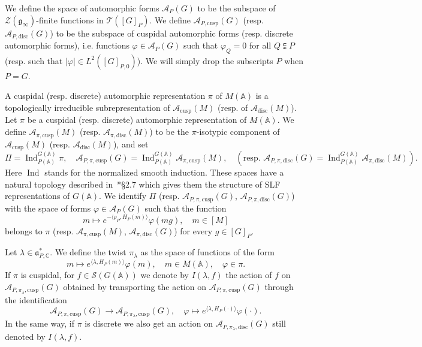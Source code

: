 \documentclass[letterpaper,11pt]{amsart}
\newcommand{\fa}{\mathfrak{a}}
\newcommand{\fg}{\mathfrak{g}}
\newcommand{\bA}{\mathbb{A}}
\newcommand{\C}{\mathbb{C}}
\newcommand{\cA}{\mathcal{A}}
\newcommand{\cS}{\mathcal{S}}
\newcommand{\cT}{\mathcal{T}}
\newcommand{\cZ}{\mathcal{Z}}
\newcommand{\<}{\negthickspace}
\newcommand{\valP}[1]{\left|#1\right|}
\DeclareMathOperator{\Ind}{Ind}
\theoremstyle{definition}
\theoremstyle{plain}
\theoremstyle{remark}
\numberwithin{equation}{section}
\begin{document}
We define the space of
automorphic forms $\cA_P(G)$ to be the subspace of $\cZ(\fg_\infty)$-finite
functions in $\cT([G]_P)$. We define $\cA_{P, \mathrm{cusp}}(G)$ (resp. $\cA_{P, \mathrm{disc}}(G)$) to be the subspace
of cuspidal automorphic forms (resp. discrete automorphic forms), i.e. functions $\varphi \in \cA_{P}(G)$ such that
$\varphi_Q = 0$ for all $Q \subsetneqq P$ (resp. such that $\valP{\varphi} \in L^2([G]_{P,0})$). We will simply drop the subscripts $P$ when $P
= G$.

A cuspidal (resp. discrete) automorphic representation $\pi$ of $M(\bA)$ is a topologically
irreducible subrepresentation of $\cA_{\mathrm{cusp}}(M)$ (resp. of $\cA_{\mathrm{disc}}(M)$). Let $\pi$ be a
cuspidal (resp. discrete) automorphic representation of $M(\bA)$. We define $\cA_{\pi,
\mathrm{cusp}}(M)$ (resp. $\cA_{\pi,
\mathrm{disc}}(M)$) to be the $\pi$-isotypic component of
$\cA_{\mathrm{cusp}}(M)$ (resp. $\cA_{\mathrm{disc}}(M)$), and set
    \[
    \Pi = \Ind_{P(\bA)}^{G(\bA)} \pi, \quad
    \cA_{P, \pi, \mathrm{cusp}}(G) = \Ind_{P(\bA)}^{G(\bA)}
    \cA_{\pi, \mathrm{cusp}}(M), \quad \left( \text{resp. } \cA_{P, \pi, \mathrm{disc}}(G) = \Ind_{P(\bA)}^{G(\bA)}
    \cA_{\pi, \mathrm{disc}}(M) \right).
    \]
Here $\Ind$ stands for the normalized smooth induction. These spaces have a natural topology described in~\cite{BPCZ}*{\S 2.7} which gives them the structure of SLF representations of $G(\bA)$. We identify
$\Pi$ (resp. $\cA_{P, \pi, \mathrm{cusp}}(G)$, $\cA_{P, \pi, \mathrm{disc}}(G)$) with the space of
forms $\varphi \in \cA_{P}(G)$ such that the function
    \[
    m \mapsto e^{-\langle \rho_P, H_P(m) \rangle} \varphi(mg), \quad
    m \in [M]
    \]
belongs to $\pi$ (resp. $\cA_{\pi, \mathrm{cusp}}(M)$, $\cA_{\pi, \mathrm{disc}}(G)$) for every $g \in [G]_P$.

Let $\lambda \in \fa_{P, \C}^*$. We define the twist $\pi_{\lambda}$ as the
space of functions of the form
    \[
    m \mapsto e^{\langle \lambda, H_P(m) \rangle} \varphi(m), \quad
    m \in M(\bA), \quad \varphi \in \pi.
    \]
If $\pi$ is cuspidal, for $f \in \cS(G(\bA))$ we denote by
$I(\lambda, f)$ the action of $f$ on $\cA_{P, \pi_{\lambda},
\mathrm{cusp}}(G)$ obtained by transporting the action on $\cA_{P,
\pi, \mathrm{cusp}}(G)$ through the identification
    \[
    \cA_{P, \pi, \mathrm{cusp}}(G) \to
    \cA_{P, \pi_{\lambda}, \mathrm{cusp}}(G), \quad
    \varphi \mapsto e^{\langle \lambda, H_P(\cdot) \rangle} \varphi(\cdot).
    \]
In the same way, if $\pi$ is discrete we also get an action on $\cA_{P, \pi_{\lambda},
\mathrm{disc}}(G)$ still denoted by $I(\lambda,f)$.
\end{document}
